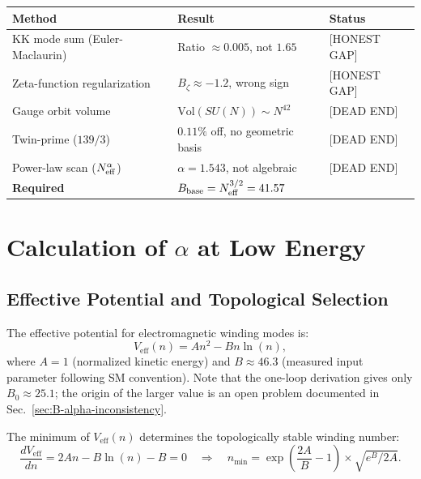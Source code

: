 \documentclass[11pt,a4paper]{article}
\theoremstyle{remark}
\begin{document}
\begin{center}
\begin{tabular}{lll}
\hline
\textbf{Method} & \textbf{Result} & \textbf{Status} \\
\hline
KK mode sum (Euler-Maclaurin) & Ratio $\approx 0.005$, not $1.65$ & [HONEST GAP] \\
Zeta-function regularization  & $B_\zeta \approx -1.2$, wrong sign & [HONEST GAP] \\
Gauge orbit volume             & $\mathrm{Vol}(SU(N)) \sim N^{42}$  & [DEAD END] \\
Twin-prime ($139/3$)           & $0.11\%$ off, no geometric basis   & [DEAD END] \\
Power-law scan ($N_{\rm eff}^\alpha$) & $\alpha = 1.543$, not algebraic & [DEAD END] \\
\hline
\textbf{Required} & $B_{\rm base} = N_{\rm eff}^{3/2} = 41.57$ & \\
\hline
\end{tabular}
\end{center}

\section{Calculation of $\alpha$ at Low Energy}
\label{sec:alpha-value}

\subsection{Effective Potential and Topological Selection}

The effective potential for electromagnetic winding modes is:
\begin{equation}
V_{\text{eff}}(n) = A n^2 - B n \ln(n),
\label{eq:V-eff}
\end{equation}
where $A = 1$ (normalized kinetic energy) and $B \approx 46.3$ (measured input parameter following SM convention). Note that the one-loop derivation gives only $B_0 \approx 25.1$; the origin of the larger value is an open problem documented in Sec.~\ref{sec:B-alpha-inconsistency}.

The minimum of $V_{\text{eff}}(n)$ determines the topologically stable winding number:
\begin{equation}
\frac{dV_{\text{eff}}}{dn} = 2An - B\ln(n) - B = 0 \quad \Rightarrow \quad n_{\text{min}} = \exp\left(\frac{2A}{B} - 1\right) \times \sqrt{e^B/2A}.
\label{eq:n-min}
\end{equation}
\end{document}
